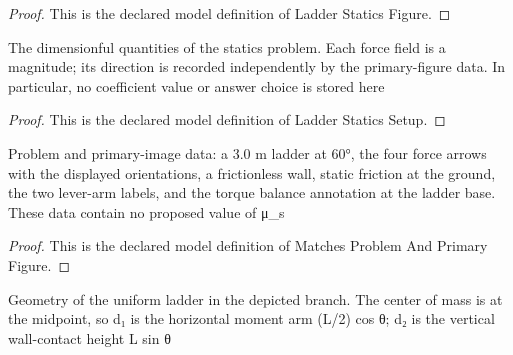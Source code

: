 \begin{proof}
  This is the declared model definition of Ladder Statics Figure.
\end{proof}
\begin{definition}
  \label{def:physics:phyx-mini-0709:phyxminiproblems-problemphyxmini0709-ladderstaticssetup}
  The dimensionful quantities of the statics problem. Each force field is a magnitude; its direction is recorded independently by the primary-figure data. In particular, no coefficient value or answer choice is stored here
\end{definition}
\begin{proof}
  This is the declared model definition of Ladder Statics Setup.
\end{proof}
\begin{definition}
  \label{def:physics:phyx-mini-0709:phyxminiproblems-problemphyxmini0709-matchesproblemandprimaryfigure}
  Problem and primary-image data: a 3.0 m ladder at 60°, the four force arrows with the displayed orientations, a frictionless wall, static friction at the ground, the two lever-arm labels, and the torque balance annotation at the ladder base. These data contain no proposed value of μ\_s
\end{definition}
\begin{proof}
  This is the declared model definition of Matches Problem And Primary Figure.
\end{proof}
\begin{definition}
  \label{def:physics:phyx-mini-0709:phyxminiproblems-problemphyxmini0709-hasuniformladdergeometry}
  Geometry of the uniform ladder in the depicted branch. The center of mass is at the midpoint, so d₁ is the horizontal moment arm (L/2) cos θ; d₂ is the vertical wall-contact height L sin θ
\end{definition}
